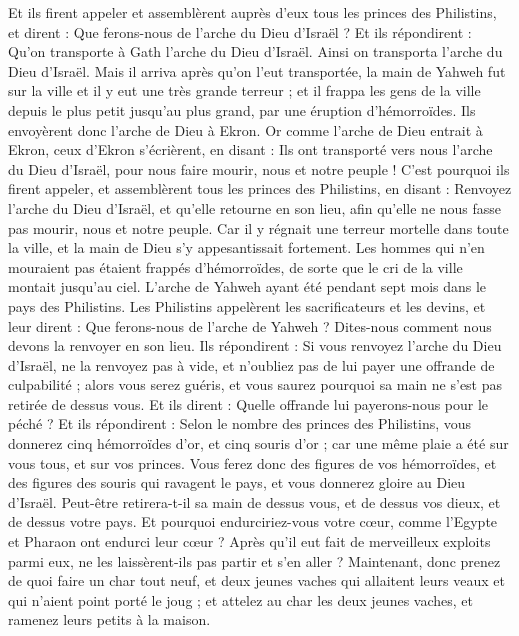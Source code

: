 \begin{multicols}{2}
Et ils firent appeler et assemblèrent auprès d’eux tous les princes des Philistins, et dirent : Que ferons-nous de l'arche du Dieu d'Israël ? Et ils répondirent : Qu'on transporte à Gath l'arche du Dieu d'Israël. Ainsi on transporta l'arche du Dieu d'Israël.
Mais il arriva après qu'on l'eut transportée, la main de Yahweh fut sur la ville et il y eut une très grande terreur ; et il frappa les gens de la ville depuis le plus petit jusqu'au plus grand, par une éruption d’hémorroïdes.
Ils envoyèrent donc l'arche de Dieu à Ekron. Or comme l'arche de Dieu entrait à Ekron, ceux d’Ekron s'écrièrent, en disant : Ils ont transporté vers nous l'arche du Dieu d'Israël, pour nous faire mourir, nous et notre peuple !
C'est pourquoi ils firent appeler, et assemblèrent tous les princes des Philistins, en disant : Renvoyez l'arche du Dieu d'Israël, et qu'elle retourne en son lieu, afin qu'elle ne nous fasse pas mourir, nous et notre peuple. Car il y régnait une terreur mortelle dans toute la ville, et la main de Dieu s’y appesantissait fortement.
Les hommes qui n'en mouraient pas étaient frappés d’hémorroïdes, de sorte que le cri de la ville montait jusqu'au ciel.
\VerseOne{}L'arche de Yahweh ayant été pendant sept mois dans le pays des Philistins.
Les Philistins appelèrent les sacrificateurs et les devins, et leur dirent : Que ferons-nous de l'arche de Yahweh ? Dites-nous comment nous devons la renvoyer en son lieu.
Ils répondirent : Si vous renvoyez l'arche du Dieu d'Israël, ne la renvoyez pas à vide, et n’oubliez pas de lui payer une offrande de culpabilité ; alors vous serez guéris, et vous saurez pourquoi sa main ne s’est pas retirée de dessus vous.
Et ils dirent : Quelle offrande lui payerons-nous pour le péché ? Et ils répondirent : Selon le nombre des princes des Philistins, vous donnerez cinq hémorroïdes d'or, et cinq souris d'or ; car une même plaie a été sur vous tous, et sur vos princes.
Vous ferez donc des figures de vos hémorroïdes, et des figures des souris qui ravagent le pays, et vous donnerez gloire au Dieu d'Israël. Peut-être retirera-t-il sa main de dessus vous, et de dessus vos dieux, et de dessus votre pays.
Et pourquoi endurciriez-vous votre cœur, comme l'Egypte et Pharaon ont endurci leur cœur ? Après qu'il eut fait de merveilleux exploits parmi eux, ne les laissèrent-ils pas partir et s’en aller ?
Maintenant, donc prenez de quoi faire un char tout neuf, et deux jeunes vaches qui allaitent leurs veaux et qui n’aient point porté le joug ; et attelez au char les deux jeunes vaches, et ramenez leurs petits à la maison.

\end{multicols}
